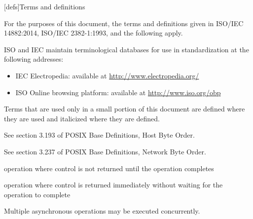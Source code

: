 
[defs]{Terms and definitions}

\pnum
{}%
For the purposes of this document,
the terms and definitions
given in ISO/IEC 14882:2014,
ISO/IEC 2382-1:1993,
and the following apply.

\pnum
ISO and IEC maintain terminological databases
for use in standardization
at the following addresses:
\begin{itemize}
\item IEC Electropedia: available at \url{http://www.electropedia.org/}
\item ISO Online browsing platform: available at \url{http://www.iso.org/obp}
\end{itemize}

\pnum
Terms that are used only in a small portion of this document
are defined where they are used and italicized where they are
defined.

%
%
See section 3.193 of POSIX Base Definitions, Host Byte Order.

%
%
See section 3.237 of POSIX Base Definitions, Network Byte Order.

%
operation where control is not returned until the operation completes

%
operation where control is returned immediately without waiting for the operation to complete

\begin{defnote}Multiple asynchronous operations may be executed concurrently.\end{defnote}

\setcounter{tocdepth}{1}
